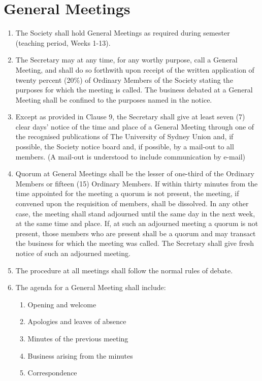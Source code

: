 \documentclass[11pt]{article}
\begin{document}
\section{General Meetings}
\begin{enumerate}[\thesection .1]
    \item The Society shall hold General Meetings as required during semester (teaching period, Weeks 1-13).
    \item The Secretary may at any time, for any worthy purpose, call a General Meeting, and shall do so forthwith upon receipt of the written application of twenty percent (20\%) of Ordinary Members of the Society stating the purposes for which the meeting is called. The business debated at a General Meeting shall be confined to the purposes named in the notice.
    \item Except as provided in Clause 9, the Secretary shall give at least seven (7) clear days’ notice of the time and place of a General Meeting through one of the recognised publications of The University of Sydney Union and, if possible, the Society notice board and, if possible, by a mail-out to all members. (A mail-out is understood to include communication by e-mail)
    \item Quorum at General Meetings shall be the lesser of one-third of the Ordinary Members or fifteen (15) Ordinary Members. If within thirty minutes from the time appointed for the meeting a quorum is not present, the meeting, if convened upon the requisition of members, shall be dissolved. In any other case, the meeting shall stand adjourned until the same day in the next week, at the same time and place. If, at such an adjourned meeting a quorum is not present, those members who are present shall be a quorum and may transact the business for which the meeting was called. The Secretary shall give fresh notice of such an adjourned meeting.
    \item The procedure at all meetings shall follow the normal rules of debate.
    \item The agenda for a General Meeting shall include:
    \begin{enumerate}[\hspace{5mm}1.]
        \item Opening and welcome
    	\item Apologies and leaves of absence
    	\item Minutes of the previous meeting
    	\item Business arising from the minutes
    	\item Correspondence

\end{enumerate}
\end{enumerate}
\end{document}
